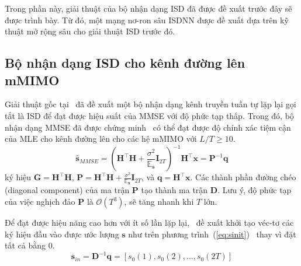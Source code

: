 Trong phần này, giải thuật của bộ nhận dạng ISD đã được đề xuất trước đây sẽ được trình bày. Từ đó, một mạng nơ-ron sâu ISDNN được đề xuất dựa trên kỹ thuật mở rộng sâu cho giải thuật ISD trước đó.

\subsection{Bộ nhận dạng ISD cho kênh đường lên mMIMO}

Giải thuật gốc tại~\cite{Mandloi2017} đã đề xuất một bộ nhận dạng kênh truyền tuần tự lặp lại gọi tắt là ISD để đạt được hiệu suất của MMSE với độ phức tạp thấp. Trong đó, bộ nhận dạng MMSE đã được chứng minh~\cite{Rusek2013} có thể đạt được độ chính xác tiệm cận của MLE cho kênh đường lên cho các hệ mMIMO với $L/T \ge 10$.
\begin{equation}
    \hat{\mathbf{s}}_{MMSE}=\left(\mathbf{H}^\top \mathbf{H}+\frac{\sigma^2}{\mathbb{E}_\mathbf{s}} \mathbf{I}_{2T}\right)^{-1} \mathbf{H}^\top \mathbf{x}=\mathbf{P}^{-1} \mathbf{q}
\end{equation}
ký hiệu $\mathbf{G} = \mathbf{H}^\top \mathbf{H}$, $\mathbf{P} = \mathbf{H}^\top \mathbf{H}+\frac{\sigma^2}{\mathbb{E}_\mathbf{x}} \mathbf{I}_{2T}$, và $\mathbf{q} = \mathbf{H}^\top \mathbf{x}$. Các thành phần đường chéo (diagonal component) của ma trận $\mathbf{P}$ tạo thành ma trận $\mathbf{D}$. Lưu ý, độ phức tạp của việc nghịch đảo $\mathbf{P}$ là $\mathcal{O}(T^3)$, sẽ tăng nhanh khi $T$ lớn. 

Để đạt được hiệu năng cao hơn với ít số lần lặp lại,~\cite{Mandloi2017} đề xuất khởi tạo véc-tơ các ký hiệu đầu vào được ước lượng $\mathbf{s}$ như trên phương trình~(\ref{eq:sinit})~\cite{Gao2014} thay vì đặt tất cả bằng $0$.
\begin{equation}
\label{eq:sinit}
    \mathbf{s}_{in}=\mathbf{D}^{-1} \mathbf{q}=\left[s_0(1), s_0(2), \ldots, s_0(2T)\right]
\end{equation}

